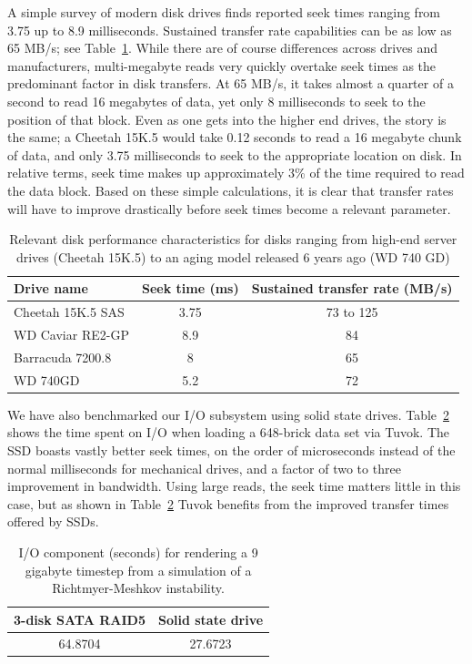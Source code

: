 A simple survey of modern disk drives finds reported seek
times ranging from 3.75 up to 8.9 milliseconds. Sustained
transfer rate capabilities can be as low as 65 MB/s; see
Table~\ref{tbl:disks}.  While there are of course differences across
drives and manufacturers, multi-megabyte reads very quickly overtake
seek times as the predominant factor in disk transfers. At 65 MB/s,
it takes almost a quarter of a second to read 16 megabytes of data,
yet only 8 milliseconds to seek to the position of that block. Even as
one gets into the higher end drives, the story is the same; a Cheetah
15K.5 would take 0.12 seconds to read a 16 megabyte chunk of data, and
only 3.75 milliseconds to seek to the appropriate location on disk.
In relative terms, seek time makes up approximately 3\% of the time
required to read the data block. Based on these simple calculations, it
is clear that transfer rates will have to improve drastically before
seek times become a relevant parameter.

\begin{table}
	\begin{center}
	\begin{tabular}{l|cc}
	\textbf{Drive name} & \textbf{Seek time (ms)} &
		\textbf{Sustained transfer rate (MB/s)}\\\hline
	Cheetah 15K.5 SAS & 3.75 & 73 to 125\\
	WD Caviar RE2-GP & 8.9 & 84\\
	Barracuda 7200.8 & 8 & 65\\
	WD 740GD & 5.2 & 72\\
	\end{tabular}
	\end{center}

  \caption{Relevant disk performance characteristics for disks ranging
  from high-end server drives (Cheetah 15K.5) to an aging model
  released 6 years ago (WD 740 GD)}
	\label{tbl:disks}
\end{table}

We have also benchmarked our I/O subsystem using solid
state drives. Table~\ref{tbl:ssd} shows the time spent on I/O when
loading a 648-brick data set via Tuvok. The SSD boasts vastly better
seek times, on the order of microseconds instead of the normal
milliseconds for mechanical drives, and a factor of two to three
improvement in bandwidth. Using large reads, the seek time matters
little in this case, but as shown in Table~\ref{tbl:ssd} Tuvok benefits
from the improved transfer times offered by SSDs.

\begin{table}
	\begin{center}
	\begin{tabular}{|c|c|}\hline
	\textbf{3-disk SATA RAID5} & \textbf{Solid state drive}\\\hline
	64.8704 & 27.6723\\\hline
	\end{tabular}
	\end{center}

  \caption{I/O component (seconds) for rendering a 9 gigabyte timestep
  from a simulation of a Richtmyer-Meshkov instability.}
	\label{tbl:ssd}
\end{table}

